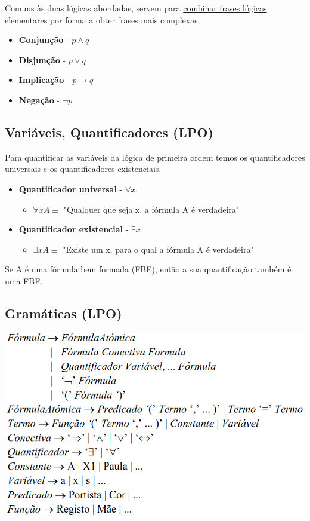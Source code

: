 \documentclass{article}
\begin{document}
Comuns às duas lógicas abordadas, servem para \uline{combinar frases lógicas elementares} por
forma a obter frases mais complexas.

\begin{itemize}
  \item \textbf{Conjunção} - $p \wedge q$
  \item \textbf{Disjunção} - $p \vee q$
  \item \textbf{Implicação} - $p \rightarrow q$
  \item \textbf{Negação} - $\neg p$
\end{itemize}

\subsection{Variáveis, Quantificadores (LPO)}

Para quantificar as variáveis da lógica de primeira ordem temos os quantificadores universais e
os quantificadores existenciais.

\begin{itemize}
  \item \textbf{Quantificador universal} - $\forall x$.
  \begin{itemize}
    \item $\forall x A \equiv$ "Qualquer que seja x, a fórmula A é verdadeira"
  \end{itemize}
  \item \textbf{Quantificador existencial} - $\exists x$
  \begin{itemize}
    \item $\exists x A \equiv$ "Existe um x, para o qual a fórmula A é verdadeira"
  \end{itemize}
\end{itemize}

Se A é uma fórmula bem formada (FBF), então a sua quantificação também é uma FBF.

\pagebreak

\subsection{Gramáticas (LPO)}

\begin{center}
  \includegraphics[scale=0.35]{26}
\end{center}
\end{document}

